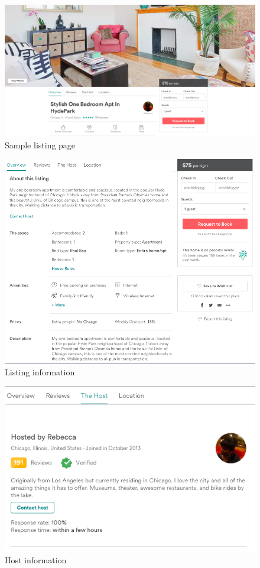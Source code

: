 
\begin{figure}[!ht]\centering
	\includegraphics[width=.8\textwidth]{figures/cover}
	\caption{Sample listing page}
	\label{fig:listing}
\end{figure}

\begin{figure}[!ht]\centering
	\includegraphics[width=.8\textwidth]{figures/property}
	\caption{Listing information}
	\label{fig:property}
\end{figure}

\begin{figure}\centering
	\includegraphics[width=.9\textwidth]{figures/host}
	\caption{Host information}
	\label{fig:host}
\end{figure}

